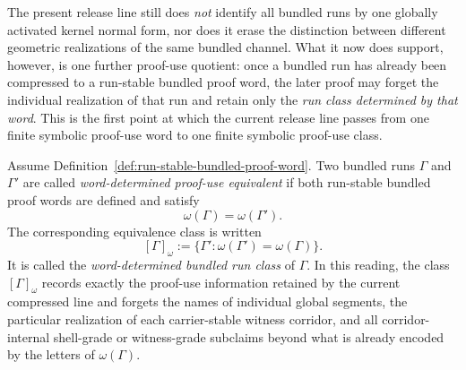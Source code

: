 \begin{remark}
\label{rem:status-of-the-first-word-determined-run-class-step}
The present release line still does \emph{not} identify all bundled runs by one globally activated kernel normal form, nor does it erase the distinction between different geometric realizations of the same bundled channel. What it now does support, however, is one further proof-use quotient: once a bundled run has already been compressed to a run-stable bundled proof word, the later proof may forget the individual realization of that run and retain only the \emph{run class determined by that word}. This is the first point at which the current release line passes from one finite symbolic proof-use word to one finite symbolic proof-use class.
\end{remark}

\begin{definition}
\label{def:word-determined-bundled-run-class}
Assume Definition~\ref{def:run-stable-bundled-proof-word}. Two bundled runs $\Gamma$ and $\Gamma'$ are called \emph{word-determined proof-use equivalent} if both run-stable bundled proof words are defined and satisfy
\[
\omega(\Gamma)=\omega(\Gamma').
\]
The corresponding equivalence class is written
\[
[\Gamma]_{\omega}:=\{\Gamma' : \omega(\Gamma')=\omega(\Gamma)\}.
\]
It is called the \emph{word-determined bundled run class} of $\Gamma$. In this reading, the class $[\Gamma]_{\omega}$ records exactly the proof-use information retained by the current compressed line and forgets the names of individual global segments, the particular realization of each carrier-stable witness corridor, and all corridor-internal shell-grade or witness-grade subclaims beyond what is already encoded by the letters of $\omega(\Gamma)$.
\end{definition}

